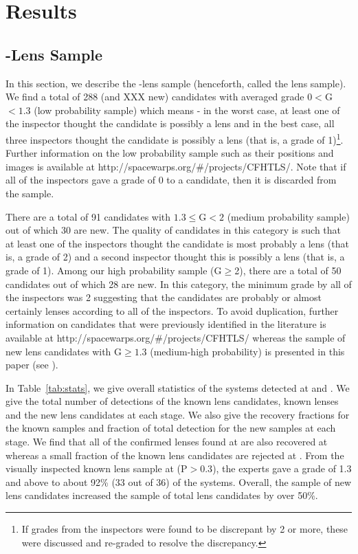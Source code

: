 \documentclass[useAMS,usenatbib,a4paper]{mn2e}
\begin{document}
\section{Results}
\label{sec:results}

\subsection{\sw-\cfhtls Lens Sample}
\label{sec:swlens}

In this section, we describe the \sw-\cfhtls lens sample (henceforth,
called the \sw lens sample). We find a total of 288 (and XXX new)
candidates with averaged grade $0<$G$<1.3$ (low probability sample)
which means - in the worst case, at least one of the inspector thought
the candidate is possibly a lens and in the best case, all three
inspectors thought the candidate is possibly a lens (that is,
a grade of 1)\footnote{If grades from the inspectors were found to be discrepant
by 2 or more, these were discussed and re-graded to resolve the
discrepancy.}. Further information on the low probability sample such as
their positions and images is available at
http://spacewarps.org/\#/projects/CFHTLS/. Note that if all of the inspectors gave
a grade of 0 to a candidate, then it is discarded from the sample. 

There are a total of 91 candidates with $1.3\le$G$<2$ (medium
probability sample) out of which 30 are new. The quality of candidates
in this category is such that at least one of the inspectors thought the
candidate is most probably a lens (that is, a grade of 2) and a second inspector
thought this is possibly a lens (that is, a grade of 1). Among our high
probability sample (G$\ge$2), there are a total of 50 candidates out of
which 28 are new. In this category, the minimum grade by all of the
inspectors was 2 suggesting that the candidates are probably or almost
certainly lenses according to all of the inspectors. To avoid
duplication, further information on \sw candidates that were previously
identified in the literature is available at
http://spacewarps.org/\#/projects/CFHTLS/ whereas the sample of new lens
candidates with G$\ge 1.3$ (medium-high probability) is presented in this paper (see
).

In Table~\ref{tab:stats}, we give overall statistics of the systems
detected at \StageOne and \StageTwo. We give the total number of
detections of the known lens candidates, known lenses and the new lens
candidates at each stage.  We also give the recovery fractions for the
known samples and fraction of total detection for the new samples at
each stage. We find that all of the confirmed lenses found
at \StageOne are also recovered at \StageTwo whereas a small fraction of
the known lens candidates are rejected at \StageTwo. From the visually
inspected known lens sample at \StageTwo (P$> 0.3$), the experts gave a
grade of 1.3 and above to about 92\% (33 out of 36) of the systems. Overall,
the sample of new \sw lens candidates increased the sample of total
\cfhtls lens candidates by over 50\%.  
\end{document}
